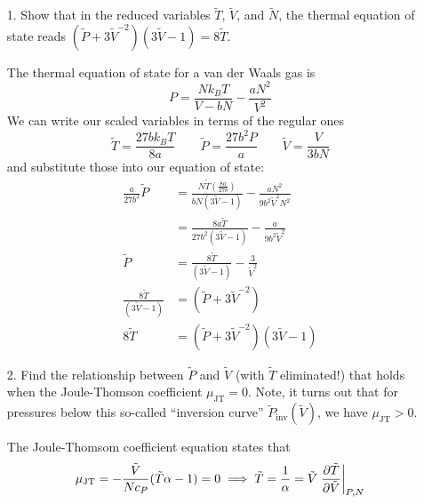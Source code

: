 \documentclass[a4paper,twoside]{article}
\begin{document}
\begin{itemize}
    \item[1.] Show that in the reduced variables $ \tilde{T} $, $ \tilde{V} $, and $ \tilde{N} $, the thermal equation of state reads $ (\tilde{P}+ 3 \tilde{V}^{-2})(3\tilde{V}-1)=8\tilde{T} $.
        \begin{problem}
            The thermal equation of state for a van der Waals gas is
            \begin{equation}
                P = \frac{N k_B T}{V - bN} - \frac{a N^2}{V^2}
            \end{equation}
            We can write our scaled variables in terms of the regular ones
            \begin{equation}
                \tilde{T}= \frac{27b k_B T}{8a} \qquad \tilde{P}= \frac{27b^2 P}{a} \qquad \tilde{V}= \frac{V}{3bN}
            \end{equation}
            and substitute those into our equation of state:
            \begin{align}
                \frac{a}{27b^2} \tilde{P}&= \frac{N \tilde{T}\left( \frac{8a}{27b} \right)}{bN(3 \tilde{V} - 1)} - \frac{aN^2}{9 b^2 \tilde{V}^2 N^2} \\
                &= \frac{8a \tilde{T}}{27b^2 (3 \tilde{V}- 1)} - \frac{a}{9 b^2\tilde{V}^2} \\
                \tilde{P} &= \frac{8\tilde{T}}{(3\tilde{V}-1)} - \frac{3}{\tilde{V}^2} \\
                \frac{8\tilde{T}}{(3\tilde{V}-1)} &= (\tilde{P}+3\tilde{V}^{-2}) \\
                8\tilde{T} &= (\tilde{P}+ 3\tilde{V}^{-2})(3\tilde{V}-1)
            \end{align}
        \end{problem}
    \item[2.] Find the relationship between $ \tilde{P} $ and $ \tilde{V} $ (with $ \tilde{T} $ eliminated!) that holds when the Joule-Thomson coefficient $ \mu_{\text{JT}} = 0 $. Note, it turns out that for pressures below this so-called ``inversion curve'' $ \tilde{P}_{\text{inv}}(\tilde{V}) $, we have $ \mu_{\text{JT}} > 0 $.
        \begin{problem}
            The Joule-Thomsom coefficient equation states that
            \begin{equation}
                \mu_{\text{JT}} = - \frac{\tilde{V}}{Nc_P} (\tilde{T} \alpha - 1) = 0 \implies \tilde{T} = \frac{1}{\alpha} = \tilde{V} \eval{\pdv{\tilde{T}}{\tilde{V}}}_{P,N}

\end{equation}
\end{problem}
\end{itemize}
\end{document}
